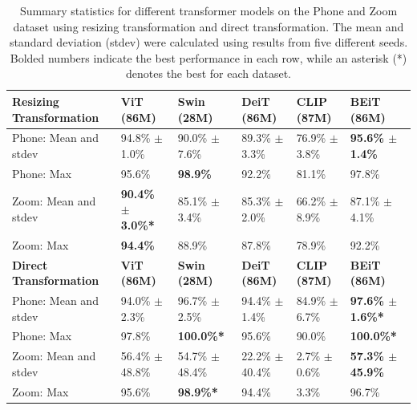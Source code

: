 \begin{table}[htbp]
    \centering
    \small
    \begin{tabular}{p{4cm}|p{2.25cm}p{2.25cm}p{2.25cm}p{2.25cm}p{2.25cm}}
        \toprule
        \textbf{Resizing Transformation} & \textbf{ViT (86M)} & \textbf{Swin (28M)} & \textbf{DeiT (86M)} & \textbf{CLIP (87M)} & \textbf{BEiT (86M)} \\ 
        \midrule
        Phone: Mean and stdev & 94.8\% $\pm$ 1.0\% & 90.0\% $\pm$ 7.6\% & 89.3\% $\pm$ 3.3\% & 76.9\% $\pm$ 3.8\% & \textbf{95.6\% $\pm$ 1.4\%} \\
        Phone: Max & 95.6\% & \textbf{98.9\%} & 92.2\% & 81.1\% & 97.8\% \\
        \midrule
        Zoom: Mean and stdev & \textbf{90.4\% $\pm$ 3.0\%*} & 85.1\% $\pm$ 3.4\% & 85.3\% $\pm$ 2.0\% & 66.2\% $\pm$ 8.9\% & 87.1\% $\pm$ 4.1\% \\
        Zoom: Max & \textbf{94.4\%} & 88.9\% & 87.8\% & 78.9\% & 92.2\% \\ 
        \bottomrule
        \noalign{\vspace{1.0em}} %
        \toprule
        \textbf{Direct Transformation} & \textbf{ViT (86M)} & \textbf{Swin (28M)} & \textbf{DeiT (86M)} & \textbf{CLIP (87M)} & \textbf{BEiT (86M)} \\ 
        \midrule
        Phone: Mean and stdev & 94.0\% $\pm$ 2.3\% & 96.7\% $\pm$ 2.5\% & 94.4\% $\pm$ 1.4\% & 84.9\% $\pm$ 6.7\% & \textbf{97.6\% $\pm$ 1.6\%*} \\
        Phone: Max & 97.8\% & \textbf{100.0\%*} & 95.6\% & 90.0\% & \textbf{100.0\%*} \\
        \midrule
        Zoom: Mean and stdev & 56.4\% $\pm$ 48.8\% & 54.7\% $\pm$ 48.4\% & 22.2\% $\pm$ 40.4\% & 2.7\% $\pm$ 0.6\% & \textbf{57.3\% $\pm$ 45.9\%} \\
        Zoom: Max & 95.6\% & \textbf{98.9\%*} & 94.4\% & 3.3\% & 96.7\% \\
        \bottomrule
    \end{tabular}
    \vspace{0.2em}
    \caption{Summary statistics for different transformer models on the Phone and Zoom dataset using resizing transformation and direct transformation. The mean and standard deviation (stdev) were calculated using results from five different seeds. Bolded numbers indicate the best performance in each row, while an asterisk (*) denotes the best for each dataset.}
    \label{tab:trans1}
\end{table}
